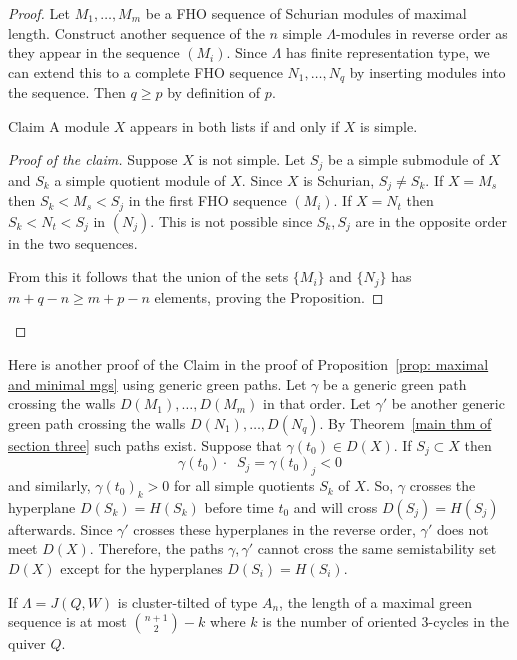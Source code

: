 \documentclass[ALCO,ThmDefs,Unicode,epreuves]{cedram}
\DeclareMathOperator{\undim}{\underline{dim}}
\begin{document}
\begin{proof} Let $M_1,\ldots,M_m$ be a FHO sequence of Schurian modules of maximal length. Construct another sequence of the $n$ simple $\Lambda$-modules in reverse order as they appear in the sequence $(M_i)$. Since $\Lambda$ has finite representation type, we can extend this to a complete FHO sequence $N_1,\ldots,N_q$ by inserting modules into the sequence. Then $q\ge p$ by definition of $p$.

\begin{enonce*}{Claim}
A module $X$ appears in both lists if and only if $X$ is simple. 
\end{enonce*}

\begin{proof}[Proof of the claim]
Suppose $X$ is not simple. Let $S_j$ be a simple submodule of $X$ and $S_k$ a simple quotient module of $X$. Since $X$ is Schurian, $S_j\neq S_k$. If $X=M_s$ then $S_k<M_s<S_j$ in the first FHO sequence $(M_i)$. If $X=N_t$ then $S_k<N_t<S_j$ in $(N_j)$. This is not possible since $S_k,S_j$ are in the opposite order in the two sequences.

From this it follows that the union of the sets $\{M_i\}$ and $\{N_j\}$ has $m+q-n\ge m+p-n$ elements, proving the Proposition. 
\qedhere\end{proof}\let\qed\relax
\end{proof}

Here is another proof of the Claim in the proof of Proposition~\ref{prop: maximal and minimal mgs} using generic green paths. Let $\gamma$ be a generic green path crossing the walls $D(M_1),\ldots,D(M_m)$ in that order. Let $\gamma'$ be another generic green path crossing the walls $D(N_1),\ldots,D(N_q)$. By Theorem~\ref{main thm of section three} such paths exist. Suppose that $\gamma(t_0)\in D(X)$. If $S_j\subset X$ then 
\[
	\gamma(t_0)\cdot \undim S_j=\gamma(t_0)_j<0
\]
and similarly, $\gamma(t_0)_k>0$ for all simple quotients $S_k$ of $X$. So, $\gamma$ crosses the hyperplane $D(S_k)=H(S_k)$ before time $t_0$ and will cross $D(S_j)=H(S_j)$ afterwards. Since $\gamma'$ crosses these hyperplanes in the reverse order, $\gamma'$ does not meet $D(X)$. Therefore, the paths $\gamma,\gamma'$ cannot cross the same semistability set $D(X)$ except for the hyperplanes $D(S_i)=H(S_i)$.

\begin{coro}\label{cor: upper bound for mgs of An}
If $\Lambda=J(Q,W)$ is cluster-tilted of type $A_n$, the length of a maximal green sequence is at most $\binom {n+1}2-k$ where $k$ is the number of oriented 3-cycles in the quiver $Q$.
\end{coro}
\end{document}
